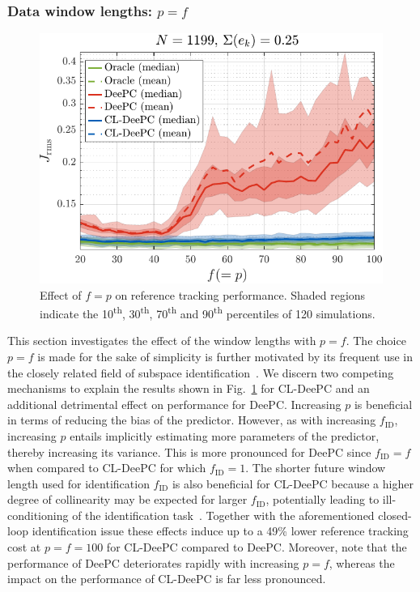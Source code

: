 \subsubsection{Data window lengths: $p=f$}
\begin{figure}[t!]
\begin{center}
\includegraphics[width=\columnwidth]{results/figures/Varying_pf_20-100-41_Nbar_1199_Re_0.25_Ru_1_Rdu_0_Q_100_R_0_dR_10.pdf}    %
\caption{Effect of $f=p$ on reference tracking performance. Shaded regions indicate the 10\textsuperscript{th}, 30\textsuperscript{th}, 70\textsuperscript{th} and 90\textsuperscript{th} percentiles of 120 simulations.}  %
\label{fig:varying_pf}                                 %
\end{center}                                 %
\end{figure}
\noindent This section investigates the effect of the window lengths with $p=f$. The choice $p=f$ is made for the sake of simplicity is further motivated by its frequent use in the closely related field of subspace identification~\citep{vanderVeen2013}. We discern two competing mechanisms to explain the results shown in Fig.~\ref{fig:varying_pf} for \ac{CL-DeePC} and an additional detrimental effect on performance for \ac{DeePC}. Increasing $p$ is beneficial in terms of reducing the bias of the predictor. However, as with increasing $f_\mathrm{ID}$, increasing $p$ entails implicitly estimating more parameters of the predictor, thereby increasing its variance. This is more pronounced for \ac{DeePC} since $f_\mathrm{ID}=f$ when compared to \ac{CL-DeePC} for which $f_\mathrm{ID}=1$. The shorter future window length used for identification $f_\mathrm{ID}$ is also beneficial for \ac{CL-DeePC} because a higher degree of collinearity may be expected for larger $f_\mathrm{ID}$, potentially leading to ill-conditioning of the identification task~\citep{Chiuso2004}. Together with the aforementioned closed-loop identification issue these effects induce up to a 49\% lower reference tracking cost at $p=f=100$ for \ac{CL-DeePC} compared to \ac{DeePC}. Moreover, note that the performance of \ac{DeePC} deteriorates rapidly with increasing $p=f$, whereas the impact on the performance of \ac{CL-DeePC} is far less pronounced.
